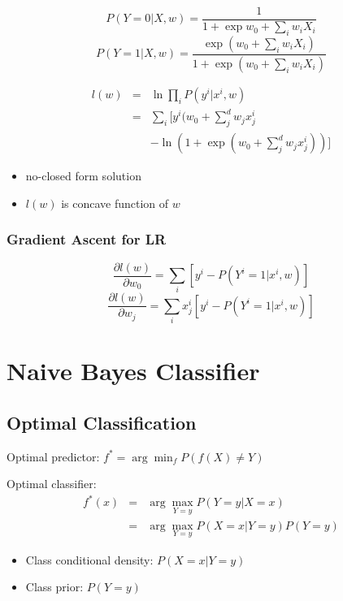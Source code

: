 \documentclass[letterpaper, 10pt, twocolumn]{article}
\begin{document}
$$P(Y=0|X,w) = \frac{1}{1+\exp{w_0+\sum_i w_iX_i}}$$
$$P(Y=1|X,w) = \frac{\exp(w_0+\sum_i w_iX_i)}{1+\exp(w_0+\sum_i w_iX_i)}$$

\begin{equation}
\begin{array}{rcl}
l(w) & = & \ln{\prod_i {P(y^i|x^i,w)}} \\
	 & = & \sum_i [y^i(w_0+\sum_j^d w_jx_j^i \\  
	 &   & - \ln(1+\exp(w_0+\sum_j^d w_jx_j^i))]
\end{array}
\end{equation}

\begin{itemize}
	\item no-closed form solution
	\item $l(w)$ is concave function of $w$
\end{itemize}

\subsubsection{Gradient Ascent for LR}

$$\frac{\partial l(w)}{\partial w_0} = \sum_i[y^i - P(Y^i=1|x^i,w)]$$
$$\frac{\partial l(w)}{\partial w_j} = \sum_i x_j^i[y^i - P(Y^i=1|x^i,w)]$$

\newpage

\section{Naive Bayes Classifier}

\subsection{Optimal Classification}

Optimal predictor: $f^*=\arg\min_f P(f(X)\neq Y)$

Optimal classifier: 
\begin{equation}
\begin{array}{rcl}
f^*(x) & = & \arg\max_{Y=y} P(Y=y|X=x) \\
	   & = & \arg\max_{Y=y} P(X=x|Y=y)P(Y=y)
\end{array}
\end{equation}

\begin{itemize}
	\item Class conditional density: $P(X=x|Y=y)$
	\item Class prior: $P(Y=y)$
\end{itemize}
\end{document}
